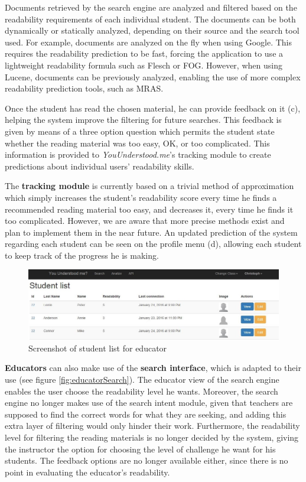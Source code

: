 \documentclass{sig-alternate-05-2015}
\begin{document}
Documents retrieved by the search engine are analyzed and filtered based on the readability requirements of each individual student. The documents can be both dynamically or statically analyzed, depending on their source and the search tool used. For example, documents are analyzed on the fly when using Google. This requires the readability prediction to be fast, forcing the application to use a lightweight readability formula such as Flesch or FOG. However, when using Lucene, documents can be previously analyzed, enabling the use of more complex readability prediction tools, such as MRAS.


Once the student has read the chosen material, he can provide feedback on it (c), helping the system improve the filtering for future searches. This feedback is given by means of a three option question which permits the student state whether the reading material was too easy, OK, or too complicated. This information is provided to \textit{YouUnderstood.me}'s tracking module to create predictions about individual users' readability skills.

The \textbf{tracking module} is currently based on a trivial method of approximation which simply increases the student's readability score every time he finds a recommended reading material too easy, and decreases it, every time he finds it too complicated. However, we are aware that more precise methods exist and plan to implement them in the near future. An updated prediction of the system regarding each student can be seen on the profile menu (d), allowing each student to keep track of the progress he is making.
\begin{figure}[ht]
 \centering
  \includegraphics[width=1\textwidth]{creatingFigures/Capture19}
 \caption{Screenshot of student list for educator}
  \label{fig:studentList}
 \end{figure}







\textbf{Educators} can also make use of the \textbf{search interface}, which is adapted to their use (see figure \ref{fig:educatorSearch}). The educator view of the search engine enables the user choose the readability level he wants. Moreover, the search engine no longer makes use of the search intent module, given that teachers are supposed to find the correct words for what they are seeking, and adding this extra layer of filtering would only hinder their work. Furthermore, the readability level for filtering the reading materials is no longer decided by the system, giving the instructor the option for choosing the level of challenge he want for his students. The feedback options are no longer available either, since there is no point in evaluating the educator's readability.
\end{document}
